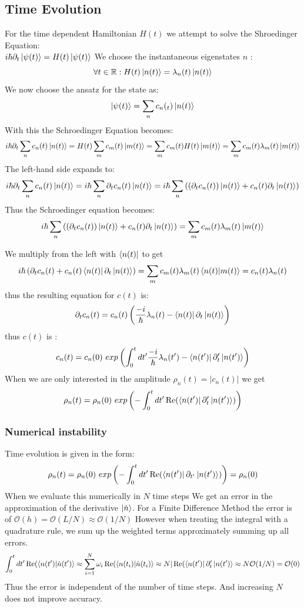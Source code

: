 \documentclass[Master]{subfiles}
\begin{document}
\subsection{Time Evolution}


For the time dependent Hamiltonian $H(t)$ we attempt to solve the Shroedinger Equation: \\ $i \hbar \partial_t \ket{\psi(t)} = H(t)\ket{\psi(t)}$
We choose the instantaneous eigenstates $n$ :
$$ \forall t \in \mathbb{R} : H(t)\ket{n(t)} = \lambda_n(t) \ket{n(t)} $$
We now choose the ansatz for the state as:
$$ \ket{\psi(t)}=\sum_n c_n(_t)\ket{n(t)} $$
With this the Schroedinger Equation becomes:
$$i \hbar \partial_t \sum_n c_n(t)\ket{n(t)}  = H(t)\sum_m c_m(t)\ket{m(t)}  = \sum_m c_m(t) H(t)\ket{m(t)}  = \sum_m c_m(t) \lambda_m(t)\ket{m(t)} $$
The left-hand side expands to:
$$ i \hbar \partial_t \sum_n c_n(t)\ket{n(t)}  = i \hbar  \sum_n  \partial_tc_n(t)\ket{n(t)}  =  i \hbar  \sum_n  \left((\partial_t c_n(t))\ket{n(t)} +  c_n(t)\partial_t \ket{n(t)} \right)$$
Thus the Schroedinger equation becomes:
$$ i \hbar  \sum_n  \left((\partial_t c_n(t))\ket{n(t)} +  c_n(t)\partial_t \ket{n(t)} \right) = \sum_m c_m(t) \lambda_m(t)\ket{m(t)} $$


We multiply from the left with $\bra{n(t)}$ to get 
$$ i \hbar   \left(\partial_t c_n(t) +  c_n(t)\bra{n(t)}\partial_t \ket{n(t)} \right) = \sum_m c_m(t) \lambda_m(t)\bra{n(t)}\ket{m(t)} =   c_n(t) \lambda_n(t)$$
thus the resulting equation for $c(t)$ is:
\begin{dmath}\label{math:SEInstEib}
\partial_t c_n(t)  =  c_n(t) \left(\frac{-i}{\hbar}\lambda_n(t) -  \bra{n(t)}\partial_t \ket{n(t)} \right)
\end{dmath}
thus $c(t)$ is :
$$ c_n(t) = c_n(0) \ exp\left( \int^t_0 dt'  \frac{-i}{\hbar}\lambda_n(t') -  \bra{n(t')}\partial_t' \ket{n(t')} \right)$$
When we are only interested in the amplitude $\rho_n(t) = |c_n(t)|$ we get
$$
 \rho_n(t) = \rho_n(0) \  exp\left( - \int^t_0 dt'  \Re(\bra{n(t')}\partial_t' \ket{n(t')} )\right)
$$
\subsubsection{Numerical instability}
 Time evolution is given in the form:
$$ \rho_n(t) = \rho_n(0) \ exp\left( - \int^t_0 dt'  \Re(\bra{n(t')}\partial_{t'} \ket{n(t')} )\right) = \rho_n(0)$$
When we evaluate this numerically in $N$ time steps 
We get an error in the approximation of the derivative $\ket{\dot n}$.
For a Finite Difference Method the error is of $\mathcal{O}(h) = \mathcal{O}(L/N) \approx \mathcal{O}(1/N)$ However when treating the integral with a quadrature rule, we sum up the weighted terms approximately summing up all errors. 
$$\int^t_0 dt'  \Re(\braket{n(t')}{\dot n(t')} 
\approx \sum_{i=1}^N \omega_i \Re(\braket{n(t_i)}{\dot n(t_i)} 
\approx N | \Re(\bra{n(t')}\partial_t' \ket{n(t')}  
\approx N  \mathcal{O}(1/N) = \mathcal{O}(0)$$
Thus the error is independent of the number of time steps. And increasing $N$ does not improve accuracy.
\end{document}
